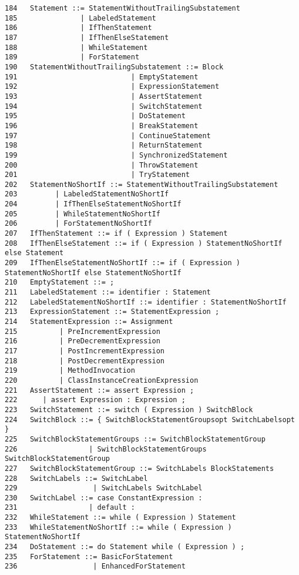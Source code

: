 {\begin{verbatim}
184   Statement ::= StatementWithoutTrailingSubstatement
185               | LabeledStatement
186               | IfThenStatement
187               | IfThenElseStatement
188               | WhileStatement
189               | ForStatement
190   StatementWithoutTrailingSubstatement ::= Block
191                           | EmptyStatement
192                           | ExpressionStatement
193                           | AssertStatement
194                           | SwitchStatement
195                           | DoStatement
196                           | BreakStatement
197                           | ContinueStatement
198                           | ReturnStatement
199                           | SynchronizedStatement
200                           | ThrowStatement
201                           | TryStatement
202   StatementNoShortIf ::= StatementWithoutTrailingSubstatement
203         | LabeledStatementNoShortIf
204         | IfThenElseStatementNoShortIf
205         | WhileStatementNoShortIf
206         | ForStatementNoShortIf
207   IfThenStatement ::= if ( Expression ) Statement
208   IfThenElseStatement ::= if ( Expression ) StatementNoShortIf else Statement
209   IfThenElseStatementNoShortIf ::= if ( Expression ) StatementNoShortIf else StatementNoShortIf
210   EmptyStatement ::= ;
211   LabeledStatement ::= identifier : Statement
212   LabeledStatementNoShortIf ::= identifier : StatementNoShortIf
213   ExpressionStatement ::= StatementExpression ;
214   StatementExpression ::= Assignment
215          | PreIncrementExpression
216          | PreDecrementExpression
217          | PostIncrementExpression
218          | PostDecrementExpression
219          | MethodInvocation
220          | ClassInstanceCreationExpression
221   AssertStatement ::= assert Expression ;
222      | assert Expression : Expression ;
223   SwitchStatement ::= switch ( Expression ) SwitchBlock
224   SwitchBlock ::= { SwitchBlockStatementGroupsopt SwitchLabelsopt }
225   SwitchBlockStatementGroups ::= SwitchBlockStatementGroup
226                 | SwitchBlockStatementGroups SwitchBlockStatementGroup
227   SwitchBlockStatementGroup ::= SwitchLabels BlockStatements
228   SwitchLabels ::= SwitchLabel
229                  | SwitchLabels SwitchLabel
230   SwitchLabel ::= case ConstantExpression :
231                 | default :
232   WhileStatement ::= while ( Expression ) Statement
233   WhileStatementNoShortIf ::= while ( Expression ) StatementNoShortIf
234   DoStatement ::= do Statement while ( Expression ) ;
235   ForStatement ::= BasicForStatement
236                  | EnhancedForStatement

\end{verbatim}}
